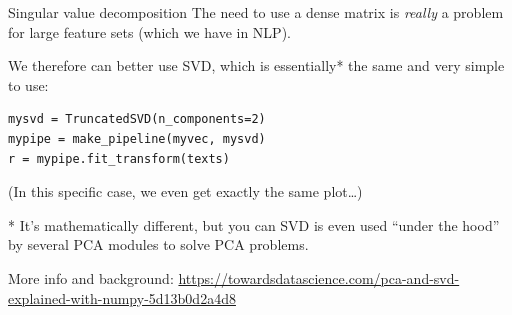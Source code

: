 \documentclass[compress]{beamer}
\begin{document}
\begin{frame}[fragile]{Singular value decomposition}
The need to use a dense matrix is \emph{really} a problem for large feature sets (which we have in NLP).
\pause

We therefore can better use SVD, which is essentially* the same and very simple to use:

\begin{lstlisting}
mysvd = TruncatedSVD(n_components=2)
mypipe = make_pipeline(myvec, mysvd)
r = mypipe.fit_transform(texts)
\end{lstlisting}

\footnotesize{(In this specific case, we even get exactly the same plot\ldots)}


\footnotesize{
* It's mathematically different, but you can SVD is even used ``under the hood'' by several PCA modules to solve PCA problems.

More info and background: \url{https://towardsdatascience.com/pca-and-svd-explained-with-numpy-5d13b0d2a4d8}}

\end{frame}


%
%
%
%
%
%
%
\end{document}
